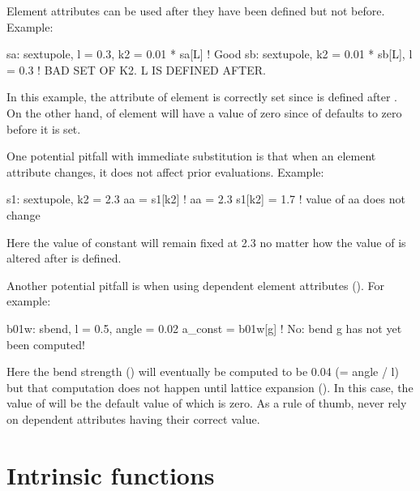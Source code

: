 {{{Element attributes can be used after they have been defined but not
before.  Example:
\begin{example}
  sa: sextupole, l = 0.3, k2 = 0.01 * sa[L]  ! Good
  sb: sextupole, k2 = 0.01 * sb[L], l = 0.3  ! BAD SET OF K2. L IS DEFINED AFTER.
\end{example}
In this example, the  attribute of element  is correctly
set since  is defined after . On the other hand, 
of element  will have a value of zero since  of 
defaults to zero before it is set.

One potential pitfall with immediate substitution is that when
an element attribute changes, it does not affect prior evaluations.
Example:
\begin{example}
  s1: sextupole, k2 = 2.3
  aa = s1[k2]              ! aa = 2.3
  s1[k2] = 1.7             ! value of aa does not change
\end{example}
Here the value of constant  will remain fixed at 2.3 no matter how
the value of  is altered after  is defined.

Another potential pitfall is when using
dependent element attributes (). For example:
\begin{example}
  b01w: sbend, l = 0.5, angle = 0.02
  a_const = b01w[g]    ! No: bend g has not yet been computed!
\end{example}
Here the bend strength  () will eventually be
computed to be 0.04 (= angle / l) but that computation does not happen
until lattice expansion (). In this case, the value of
 will be the default value of  which is zero.  As a
rule of thumb, never rely on dependent attributes having their correct
value.

\section{Intrinsic functions}
\label{s:functions}

}}}
